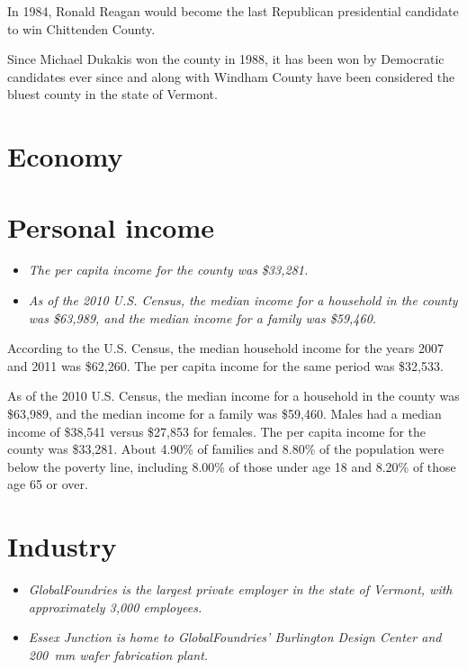 In 1984, Ronald Reagan would become the last Republican presidential
candidate to win Chittenden County.

Since Michael Dukakis won the county in 1988, it has been won by
Democratic candidates ever since and along with Windham County have been
considered the bluest county in the state of Vermont.

\section{Economy}\label{economy}

\section{Personal income}\label{personal-income}

\begin{itemize}
\item
  \emph{The per capita income for the county was \$33,281.}
\item
  \emph{As of the 2010 U.S. Census, the median income for a household in
  the county was \$63,989, and the median income for a family was
  \$59,460.}
\end{itemize}

According to the U.S. Census, the median household income for the years
2007 and 2011 was \$62,260. The per capita income for the same period
was \$32,533.

As of the 2010 U.S. Census, the median income for a household in the
county was \$63,989, and the median income for a family was \$59,460.
Males had a median income of \$38,541 versus \$27,853 for females. The
per capita income for the county was \$33,281. About 4.90\% of families
and 8.80\% of the population were below the poverty line, including
8.00\% of those under age 18 and 8.20\% of those age 65 or over.

\section{Industry}\label{industry}

\begin{itemize}
\item
  \emph{GlobalFoundries is the largest private employer in the state of
  Vermont, with approximately 3,000 employees.}
\item
  \emph{Essex Junction is home to GlobalFoundries' Burlington Design
  Center and 200~mm wafer fabrication plant.}
\end{itemize}

